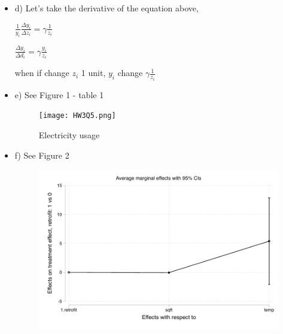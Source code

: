 \documentclass{article}
\begin{document}
\begin{enumerate}
\begin{itemize}
\vspace{0.5cm}
\item d)
\vspace{0.5cm}
Let's take the derivative of the equation above,

${\frac{1}{y_i}}{\frac{\Delta{y_i}}{\Delta{z_i}}} = {\gamma}{\frac{1}{z_i}}$

${\frac{\Delta{y_i}}{\Delta{d_i}} = {\gamma}{\frac{y_i}{z_i}}} $

when if change ${z_i}$ 1 unit, ${y_i}$ change ${\gamma}{\frac{1}{z_i}}$

\item e)
\noindent See Figure 1 - table 1 
\begin{figure}[]
    \centering
     \texttt{[image: HW3Q5.png]}
    \caption{Electricity usage}
    \label{tab:question3}
\end{figure}

\item f)
\noindent See Figure 2
\begin{figure}[]
    \centering
     \includegraphics{HW3Q6.pdf}
    \caption{}
    \label{tab:question3}
\end{figure}

\end {itemize}

\end{enumerate}
\end{document}
